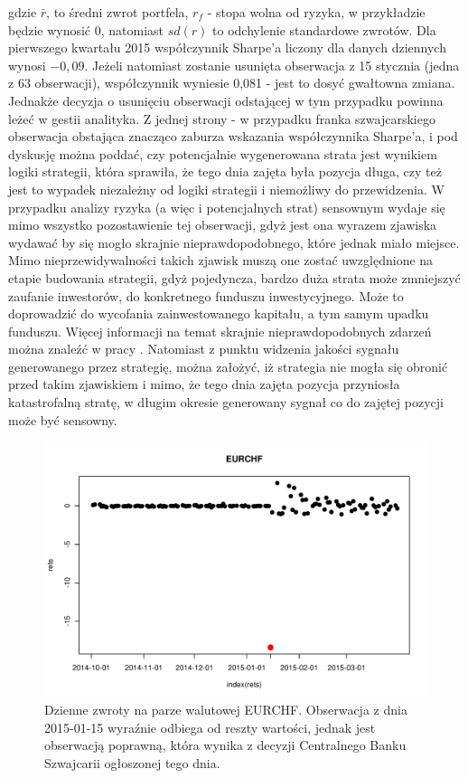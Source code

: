 \documentclass[a4paper,12pt,openany, DIV=calc, headsepline]{scrbook}
\begin{document}
gdzie $\bar{r}$, to średni zwrot portfela, $r_f$ - stopa wolna od ryzyka, w przykładzie będzie wynosić $0$, natomiast $sd(r)$ to odchylenie standardowe zwrotów. Dla pierwszego kwartału 2015 współczynnik Sharpe'a liczony dla danych dziennych wynosi $-0,09$. Jeżeli natomiast zostanie usunięta obserwacja z 15 stycznia (jedna z 63 obserwacji), współczynnik wyniesie 0,081 - jest to dosyć gwałtowna zmiana. Jednakże decyzja o usunięciu obserwacji odstającej w tym przypadku powinna leżeć w gestii analityka. Z jednej strony - w przypadku franka szwajcarskiego obserwacja obstająca znacząco zaburza wskazania współczynnika Sharpe'a, i pod dyskusję można poddać, czy potencjalnie wygenerowana strata jest wynikiem logiki strategii, która sprawiła, że tego dnia zajęta była pozycja długa, czy też jest to wypadek niezależny od logiki strategii i niemożliwy do przewidzenia. W przypadku analizy ryzyka (a więc i potencjalnych strat) sensownym wydaje się mimo wszystko pozostawienie tej obserwacji, gdyż jest ona wyrazem zjawiska wydawać by się mogło skrajnie  nieprawdopodobnego, które jednak miało miejsce. Mimo nieprzewidywalności takich zjawisk muszą one zostać uwzględnione na etapie budowania strategii, gdyż pojedyncza, bardzo duża strata może zmniejszyć zaufanie inwestorów, do konkretnego funduszu inwestycyjnego. Może to doprowadzić do wycofania zainwestowanego kapitału, a tym samym upadku funduszu. Więcej informacji na temat skrajnie nieprawdopodobnych zdarzeń można znaleźć w pracy \citep{Taleb2007}. Natomiast z punktu widzenia jakości sygnału generowanego przez strategię, można założyć, iż strategia nie mogła się obronić przed takim zjawiskiem i mimo, że tego dnia zajęta pozycja przyniosła katastrofalną stratę, w długim okresie generowany sygnał co do zajętej pozycji może być sensowny.



\begin{figure}[H]
  \centering
  \includegraphics[scale=0.5]{wykresy/EURCHF}
  \caption{Dzienne zwroty na parze walutowej EURCHF. Obserwacja z dnia 2015-01-15 wyraźnie odbiega od reszty wartości, jednak jest obserwacją poprawną, która wynika z decyzji Centralnego Banku Szwajcarii ogłoszonej tego dnia.}
  \label{fig:eurchf}
\end{figure}
\end{document}

